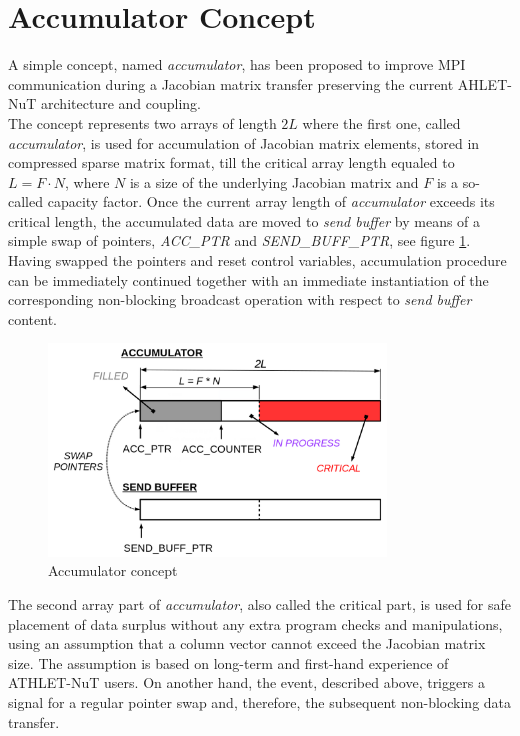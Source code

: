 \section{Accumulator Concept}
\label{sec:accumulator-approach}



A simple concept, named \textit{accumulator}, has been proposed to improve MPI communication during a Jacobian matrix transfer preserving the current AHLET-NuT architecture and coupling.\\


The concept represents two arrays of length $2L$ where the first one, called \textit{accumulator}, is used for accumulation of Jacobian matrix elements, stored in compressed sparse matrix format, till the critical array length equaled to $L = F \cdot N$, where $N$ is a size of the underlying Jacobian matrix and $F$ is a so-called capacity factor. Once the current array length of \textit{accumulator} exceeds its critical length, the accumulated data are moved to \textit{send buffer} by means of a simple swap of pointers, \textit{ACC\_PTR} and \textit{SEND\_BUFF\_PTR}, see figure \ref{fig:accumulator-concept}. Having swapped the pointers and reset control variables, accumulation procedure can be immediately continued together with an immediate instantiation of the corresponding non-blocking broadcast operation with respect to \textit{send buffer} content.\\


\begin{figure}[htpb]
  \centering
  \includegraphics[width=0.8\textwidth]{figures/chapter-3/accumulator-concept.png}
  \caption{Accumulator concept} \label{fig:accumulator-concept}
\end{figure}


The second array part of \textit{accumulator}, also called the critical part, is used for safe placement of data surplus without any extra program checks and manipulations, using an assumption that a column vector cannot exceed the Jacobian matrix size. The assumption is based on long-term and first-hand experience of ATHLET-NuT users. On another hand, the event, described above, triggers a signal for a regular pointer swap and, therefore, the subsequent non-blocking data transfer.\\


